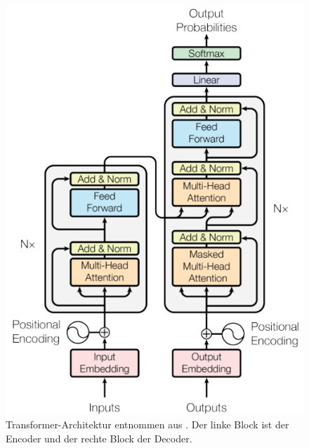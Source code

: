 \documentclass[12pt,letterpaper,ngerman]{article}
\begin{document}
\begin{figure}
  \begin{center}
    \includegraphics[scale=0.6]{abb/transformer-figure.png}
  \end{center}
  \caption{
      Transformer-Architektur entnommen aus \cite{transformer}.
      Der linke Block ist der Encoder und der rechte Block der Decoder.
  }
\end{figure} 
\end{document}
